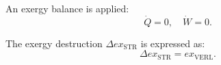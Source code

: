 An exergy balance is applied:  
\[
\dot{Q} = 0, \quad \dot{W} = 0.
\]  

The exergy destruction \( \Delta ex_{\text{STR}} \) is expressed as:  
\[
\Delta ex_{\text{STR}} = ex_{\text{VERL}}.
\]